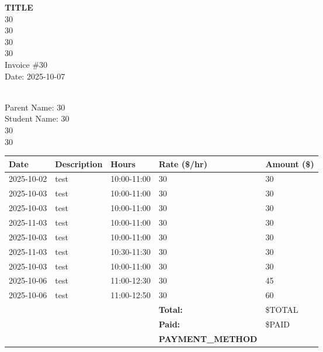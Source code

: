 \documentclass[11pt]{article}
\begin{document}
\pagestyle{empty}

\begin{center}
  {\LARGE\bf {{TITLE}}} \\
  {\large 30} \\
  \vspace{0.5em}
  {\large 30} \\
  {\large 30} \\
  {\large 30} \\
  \vspace{2em}
  {\large Invoice \#30} \\
  {Date: 2025-10-07}
\end{center}

\vspace{1em}

 \\
Parent Name: 30 \\
Student Name: 30 \\
30 \\
30 \\

\vspace{1em}

\vspace{1em}

\renewcommand{\arraystretch}{1.2}
\begin{longtable}{@{} p{3cm} p{6cm} p{2cm} p{2cm} p{2cm} @{} }
  \toprule
  \textbf{Date} & \textbf{Description} & \textbf{Hours} & \textbf{Rate (\$/hr)} & \textbf{Amount (\$)} \\
  \midrule
2025-10-02 & test & 10:00-11:00 & 30 & 30 \\
2025-10-03 & test & 10:00-11:00 & 30 & 30 \\
2025-10-03 & test & 10:00-11:00 & 30 & 30 \\
2025-11-03 & test & 10:00-11:00 & 30 & 30 \\
2025-10-03 & test & 10:00-11:00 & 30 & 30 \\
2025-11-03 & test & 10:30-11:30 & 30 & 30 \\
2025-10-03 & test & 10:00-11:00 & 30 & 30 \\
2025-10-06 & test & 11:00-12:30 & 30 & 45 \\
2025-10-06 & test & 11:00-12:50 & 30 & 60 \\
  \midrule
  & & & \textbf{Total:} & \${{TOTAL}} \\
  & & & \textbf{Paid:} & \${{PAID}} \\
  & & & \textbf{{PAYMENT_METHOD}} & \\
  \bottomrule
\end{longtable}

\vfill
\end{document}
